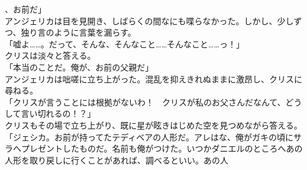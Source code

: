 \documentclass[b5j,10pt,openany]{jsbook}
\begin{document}
、お前だ」\\アンジェリカは目を見開き、しばらくの間なにも喋らなかった。しかし、少しずつ、独り言のように言葉を漏らす。\\「嘘よ\ldots{}\ldots{}。だって、そんな、そんなこと\ldots{}\ldots{}そんなこと\ldots{}\ldots{}っ！」\\クリスは淡々と答える。\\「本当のことだ。俺が、お前の父親だ」\\アンジェリカは咄嗟に立ち上がった。混乱を抑えきれぬままに激昂し、クリスに尋ねる。\\「クリスが言うことには根拠がないわ！　クリスが私のお父さんだなんて、どうして言い切れるの！？」\\クリスもその場で立ち上がり、既に星が眩きはじめた空を見つめながら答える。\\「ジェシカ。お前が持ってたテディベアの人形だ。アレはな、俺がガキの頃にサラへプレゼントしたものだ。名前も俺がつけた。いつかダニエルのところへあの人形を取り戻しに行くことがあれば、調べるといい。あの人
\end{document}
